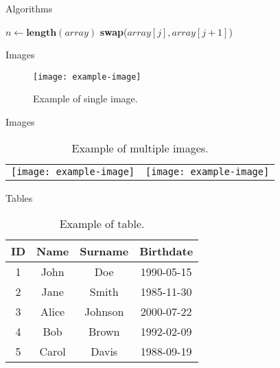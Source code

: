 \documentclass[12pt]{beamer}
\begin{document}
\begin{frame}[allowframebreaks]{Algorithms}
\begin{algorithmic}
    \State $n \gets \textbf{length}(array)$
                \State \textbf{swap}($array[j], array[j + 1]$)
            \EndIf
        \EndFor
    \EndFor
\EndProcedure
\label{alg:1}
\end{algorithmic}
\end{frame}

\begin{frame}[allowframebreaks]{Images}
\begin{figure}
    \centering
    \texttt{[image: example-image]}
    \caption{Example of single image.}
    \label{fig:1}
\end{figure}
\end{frame}

\begin{frame}[allowframebreaks]{Images}
\begin{table}
    \centering
    \begin{tabular}{cc}
        \texttt{[image: example-image]} &
        \texttt{[image: example-image]} \\
    \end{tabular}
    \caption{Example of multiple images.}
    \label{tab:1}
\end{table}
\end{frame}

\begin{frame}[allowframebreaks]{Tables}
\begin{table}
    \centering
    \begin{tabular}{|c|c|c|c|}
        \hline
        \textbf{ID} & \textbf{Name} & \textbf{Surname} & \textbf{Birthdate} \\
        \hline
        1 & John & Doe & 1990-05-15 \\
        \hline
        2 & Jane & Smith & 1985-11-30 \\
        \hline
        3 & Alice & Johnson & 2000-07-22 \\
        \hline
        4 & Bob & Brown & 1992-02-09 \\
        \hline
        5 & Carol & Davis & 1988-09-19 \\
        \hline
    \end{tabular}
    \caption{Example of table.}
    \label{tab:2}
\end{table}
\end{frame}
\end{document}
